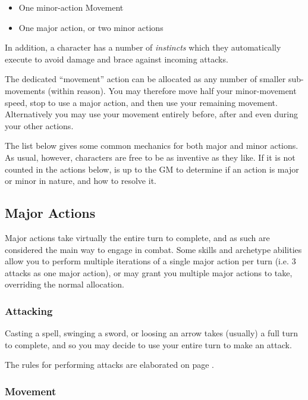  \begin{itemize}
	\item One minor-action Movement
	\item One major action, or two minor actions
 \end{itemize}
 
 In addition, a character has a number of {\it instincts} which they automatically execute to avoid damage and brace against incoming attacks. 
 
 The dedicated ``movement'' action can be allocated as any number of smaller sub-movements (within reason). You may therefore move half your minor-movement speed, stop to use a major action, and then use your remaining movement. Alternatively you may use your movement entirely before, after and even during your other actions.  
 
 The list below gives some common mechanics for both major and minor actions. As usual, however, characters are free to be as inventive as they like. If it is not counted in the actions below, is up to the GM to determine if an action is major or minor in nature, and how to resolve it. 
 
 \subsection{Major Actions}
 
 Major actions take virtually the entire turn to complete, and as such are considered the main way to engage in combat. Some skills and archetype abilities allow you to perform multiple iterations of a single major action per turn (i.e. 3 attacks as one major action), or may grant you multiple major actions to take, overriding the normal allocation. 
 
 \subsubsection{Attacking}
 
 Casting a spell, swinging a sword, or loosing an arrow takes (usually) a full turn to complete, and so you may decide to use your entire turn to make an attack.
 
The rules for performing attacks are elaborated on page \pageref{S:Attacks}.

 \subsubsection{Movement}
 
